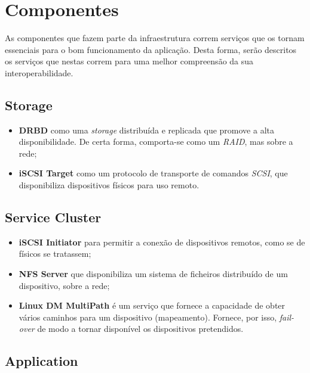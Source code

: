 \section{Componentes}

As componentes que fazem parte da infraestrutura correm serviços que os tornam essenciais para o bom funcionamento da aplicação. Desta forma, serão descritos os serviços que nestas correm para uma melhor compreensão da sua interoperabilidade.

\subsection{Storage}

\begin{itemize}
	\item \textbf{DRBD} como uma \emph{storage} distribuída e replicada que promove a alta disponibilidade. De certa forma, comporta-se como um \emph{RAID}, mas sobre a rede;
	\item \textbf{iSCSI Target} como um protocolo de transporte de comandos \emph{SCSI}, que disponibiliza dispositivos físicos para uso remoto.
\end{itemize}

\subsection{Service Cluster}
\begin{itemize}
	\item \textbf{iSCSI Initiator} para permitir a conexão de dispositivos remotos, como se de físicos se tratassem;
	\item \textbf{NFS Server} que disponibiliza um sistema de ficheiros distribuído de um dispositivo, sobre a rede;
	\item \textbf{Linux DM MultiPath} é um serviço que fornece a capacidade de obter vários caminhos para um dispositivo (mapeamento). Fornece, por isso, \emph{fail-over} de modo a tornar disponível os dispositivos pretendidos.
\end{itemize}

\subsection{Application}

